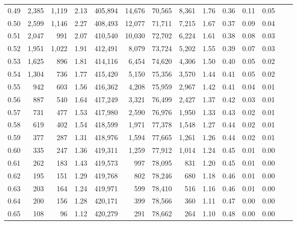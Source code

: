 \begin{tabular}{rrrrrrrrrrrrrr}
0.49 &   2,385 &  1,119 &    2.13 &  405,894 &   14,676 &  70,565 &   8,361 &  1.76 &  0.36 &  0.11 &      0.05 \\
0.50 &   2,599 &  1,146 &    2.27 &  408,493 &   12,077 &  71,711 &   7,215 &  1.67 &  0.37 &  0.09 &      0.04 \\
0.51 &   2,047 &    991 &    2.07 &  410,540 &   10,030 &  72,702 &   6,224 &  1.61 &  0.38 &  0.08 &      0.03 \\
0.52 &   1,951 &  1,022 &    1.91 &  412,491 &    8,079 &  73,724 &   5,202 &  1.55 &  0.39 &  0.07 &      0.03 \\
0.53 &   1,625 &    896 &    1.81 &  414,116 &    6,454 &  74,620 &   4,306 &  1.50 &  0.40 &  0.05 &      0.02 \\
0.54 &   1,304 &    736 &    1.77 &  415,420 &    5,150 &  75,356 &   3,570 &  1.44 &  0.41 &  0.05 &      0.02 \\
0.55 &     942 &    603 &    1.56 &  416,362 &    4,208 &  75,959 &   2,967 &  1.42 &  0.41 &  0.04 &      0.01 \\
0.56 &     887 &    540 &    1.64 &  417,249 &    3,321 &  76,499 &   2,427 &  1.37 &  0.42 &  0.03 &      0.01 \\
0.57 &     731 &    477 &    1.53 &  417,980 &    2,590 &  76,976 &   1,950 &  1.33 &  0.43 &  0.02 &      0.01 \\
0.58 &     619 &    402 &    1.54 &  418,599 &    1,971 &  77,378 &   1,548 &  1.27 &  0.44 &  0.02 &      0.01 \\
0.59 &     377 &    287 &    1.31 &  418,976 &    1,594 &  77,665 &   1,261 &  1.26 &  0.44 &  0.02 &      0.01 \\
0.60 &     335 &    247 &    1.36 &  419,311 &    1,259 &  77,912 &   1,014 &  1.24 &  0.45 &  0.01 &      0.00 \\
0.61 &     262 &    183 &    1.43 &  419,573 &      997 &  78,095 &     831 &  1.20 &  0.45 &  0.01 &      0.00 \\
0.62 &     195 &    151 &    1.29 &  419,768 &      802 &  78,246 &     680 &  1.18 &  0.46 &  0.01 &      0.00 \\
0.63 &     203 &    164 &    1.24 &  419,971 &      599 &  78,410 &     516 &  1.16 &  0.46 &  0.01 &      0.00 \\
0.64 &     200 &    156 &    1.28 &  420,171 &      399 &  78,566 &     360 &  1.11 &  0.47 &  0.00 &      0.00 \\
0.65 &     108 &     96 &    1.12 &  420,279 &      291 &  78,662 &     264 &  1.10 &  0.48 &  0.00 &      0.00 \\

\end{tabular}

